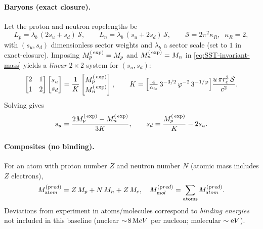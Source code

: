 \documentclass[10pt,reprint,aps,onecolumn,nofootinbib]{revtex4-2}
\begin{document}
    \paragraph{Baryons (exact closure).}
        Let the proton and neutron ropelengths be
        \[
            L_p=\lambda_b\,(2s_u+s_d)\,\mathcal S,\qquad
            L_n=\lambda_b\,(s_u+2s_d)\,\mathcal S,\qquad
            \mathcal S=2\pi^2\kappa_R,\;\;\kappa_R=2,
        \]
        with $(s_u,s_d)$ dimensionless sector weights and $\lambda_b$ a sector scale (set to $1$ in exact-closure).
        Imposing $M_p^{\textrm(\exp)}=M_p$ and $M_n^{\textrm(\exp)}=M_n$ in \eqref{eq:SST-invariant-mass} yields a \emph{linear} $2\times2$ system for $(s_u,s_d)$:
        \[
            \begin{bmatrix}
            2 & 1\\[2pt]
            1 & 2
            \end{bmatrix}
            \begin{bmatrix}
            s_u\\ s_d
            \end{bmatrix}

            =
            \frac{1}{K}
            \begin{bmatrix}
            M_p^{\textrm(\exp)}\\ M_n^{\textrm(\exp)}
            \end{bmatrix},
            \qquad
            K=\Big[\tfrac{4}{\alpha_{\textrm fs}}\,3^{-3/2}\,\varphi^{-2}\,3^{-1/\varphi}\Big]\frac{u\,\pi r_c^3\,\mathcal S}{c^2}.
        \]
        Solving gives
        \[
            s_u=\frac{2M_p^{\textrm(\exp)}-M_n^{\textrm(\exp)}}{3K},
            \qquad
            s_d=\frac{M_p^{\textrm(\exp)}}{K}-2s_u.
        \]

    \paragraph{Composites (no binding).}
        For an atom with proton number $Z$ and neutron number $N$ (atomic mass includes $Z$ electrons),
        \[
            M_{\textrm atom}^{(\textrm pred)} = Z\,M_p+N\,M_n+Z\,M_e,\quad
            M_{\textrm mol}^{(\textrm pred)}=\sum_{\text{atoms}}M_{\textrm atom}^{(\textrm pred)}.
        \]
        Deviations from experiment in atoms/molecules correspond to \emph{binding energies} not included in this baseline (nuclear $\sim\!8\,{\textrm MeV}$ per nucleon; molecular $\sim{\textrm eV}$).

\end{document}

